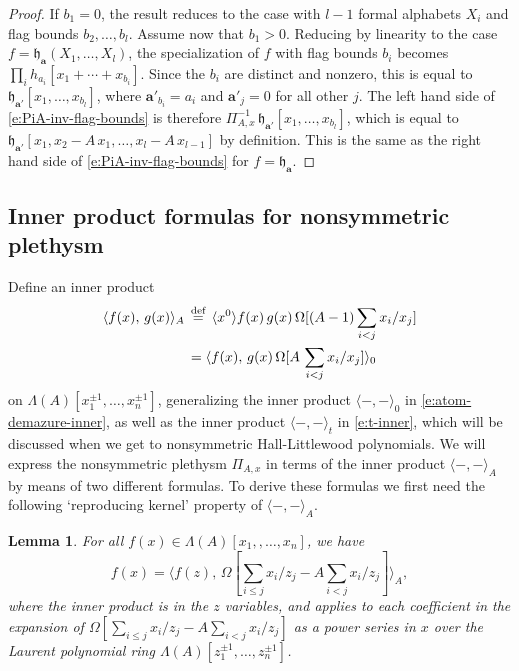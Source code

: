 \documentclass[12pt]{amsart}
\newtheorem{lemma}[thm]{Lemma}
\theoremstyle{definition}
\theoremstyle{remark}
\newcommand{\aA}{{\mathbf a}}
\newcommand{\fh}{{\mathfrak h}}
\newcommand{\defeq}{\mathrel{\overset{\text{{\rm def}}}{=}}}
\begin{document}
\begin{proof}
If $b_{1} = 0$, the result reduces to the case with $l-1$ formal alphabets
$X_{i}$ and flag bounds $b_{2},\ldots,b_{l}$.  Assume now that
$b_{1}>0$.  Reducing by linearity to the case $f=\fh _{\aA
}(X_{1},\ldots,X_{l})$, the specialization of $f$ with flag bounds
$b_{i}$ becomes $\prod _{i} h_{a_{i}}[x_{1}+\cdots +x_{b_{i}}]$.
Since the $b_{i}$ are distinct and nonzero, this is equal to $\fh
_{\aA '}[x_{1},\ldots,x_{b_{l}}]$, where $\aA '_{b_{i}} = a_{i}$ and
$\aA '_{j} = 0$ for all other $j$.  The left hand side of
\eqref{e:PiA-inv-flag-bounds} is therefore $\Pi _{A,x}^{-1} \, \fh
_{\aA '}[x_{1},\ldots,x_{b_{l}}]$, which is equal to $\fh _{\aA
'}[x_{1},x_{2}-A\, x_{1},\ldots,x_{l}-A\, x_{l-1}]$ by definition.
This is the same as the right hand side of
\eqref{e:PiA-inv-flag-bounds} for $f=\fh _{\aA }$.
\end{proof}


\subsection{Inner product formulas for nonsymmetric plethysm}
\label{ss:PiA-via-inner}

Define an inner product
\begin{align}\label{e:A-inner-product}
\langle f(x),\, g(x) \rangle _{A}\, &	\defeq\, \langle x^{0} \rangle
f(x)\, g(x)\, \Omega [(A-1)\sum _{i<j} x_{i}/x_{j}]\\
\label{e:A-inner-product-2}
& = \langle f(x),\, g(x)\, \Omega [A\, \sum _{i<j} x_{i}/x_{j}]
\rangle _{0}
\end{align}
on $\Lambda (A)[x_{1}^{\pm 1},\ldots,x_{n}^{\pm 1}]$, generalizing the
inner product $\langle -,- \rangle _{0}$ in
\eqref{e:atom-demazure-inner}, as well as the inner product $\langle
-,- \rangle _{t}$ in \eqref{e:t-inner}, which will be discussed when
we get to nonsymmetric Hall-Littlewood polynomials.  We will express
the nonsymmetric plethysm $\Pi _{A,x}$ in terms of the inner product
$\langle -,- \rangle _{A}$ by means of two different formulas.  To
derive these formulas we first need the following `reproducing kernel'
property of $\langle -,- \rangle _{A}$.

\begin{lemma}\label{lem:reproducing-kernel}
For all $f(x)\in \Lambda (A)[x_{1}, ,\ldots,x_{n}]$, we have
\begin{equation}\label{e:reproducing-kernel}
f(x) = \langle f(z), \, \Omega [\sum _{i\leq j}x_{i}/z_{j} - A\sum
_{i<j}x_{i}/z_{j}] \rangle _{A},
\end{equation}
where the inner product is in the $z$ variables, and applies to each
coefficient in the expansion of $\Omega [\sum _{i\leq j}x_{i}/z_{j} -
A\sum _{i<j}x_{i}/z_{j}]$ as a power series in $x$ over the Laurent
polynomial ring $\Lambda (A)[z_{1} ^{\pm 1}, \ldots, z_{n} ^{\pm 1}]$.
\end{lemma}
\end{document}
